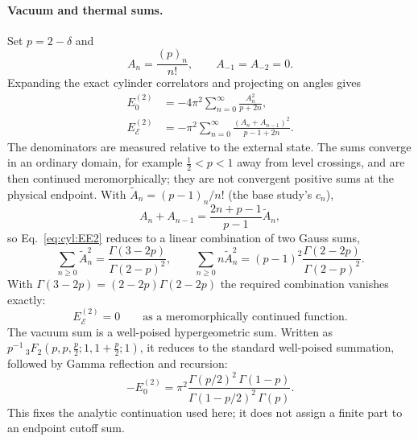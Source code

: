 \documentclass[11pt,a4paper]{article}
\numberwithin{equation}{section}
\begin{document}
\paragraph{Vacuum and thermal sums.} Set $p=2-\delta$ and
\begin{equation}
 A_n=\frac{(p)_n}{n!},\qquad A_{-1}=A_{-2}=0.
\end{equation}
Expanding the exact cylinder correlators and projecting on angles gives
\begin{align}
 E_0^{(2)}&=-4\pi^2\sum_{n=0}^\infty\frac{A_n^2}{p+2n},\label{eq:cyl:E02}\\
 E_{\mathcal E}^{(2)}&=-\pi^2\sum_{n=0}^\infty\frac{(A_n+A_{n-1})^2}{p-1+2n}.\label{eq:cyl:EE2}
\end{align}
The denominators are measured relative to the external state. The sums converge in an ordinary domain, for example
$\frac12<p<1$ away from level crossings, and are then continued meromorphically; they are not convergent positive sums
at the physical endpoint. With $\tilde A_n=(p-1)_n/n!$ (the base study's $c_n$),
\begin{equation}
 A_n+A_{n-1}=\frac{2n+p-1}{p-1}\tilde A_n,
\end{equation}
so Eq.~\eqref{eq:cyl:EE2} reduces to a linear combination of two Gauss sums,
\begin{equation}
 \sum_{n\ge0}\tilde A_n^2=\frac{\Gamma(3-2p)}{\Gamma(2-p)^2},\qquad
 \sum_{n\ge0}n\tilde A_n^2=(p-1)^2\frac{\Gamma(2-2p)}{\Gamma(2-p)^2}.
\end{equation}
With $\Gamma(3-2p)=(2-2p)\Gamma(2-2p)$ the required combination vanishes exactly:
\begin{equation}
 E_{\mathcal E}^{(2)}=0\qquad\text{as a meromorphically continued function.}
\end{equation}
The vacuum sum is a well-poised hypergeometric sum. Written as $p^{-1}\,{}_3F_2(p,p,\frac p2;1,1+\frac p2;1)$, it
reduces to the standard well-poised summation, followed by Gamma reflection and recursion:
\begin{equation}
 -E_0^{(2)}=\pi^2\frac{\Gamma(p/2)^2\,\Gamma(1-p)}{\Gamma(1-p/2)^2\,\Gamma(p)}.
 \label{eq:cyl:vac}
\end{equation}
This fixes the analytic continuation used here; it does not assign a finite part to an endpoint cutoff sum.
\end{document}
